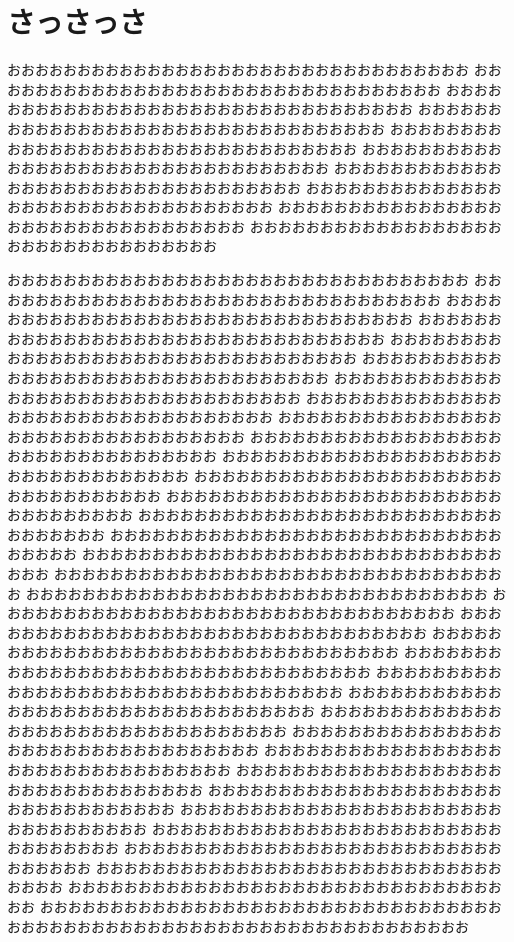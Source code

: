 \documentclass{jbook}
\begin{document}
\section{さっさっさ}
おおおおおおおおおおおおおおおおおおおおおおおおおおおおおおおおお
おおおおおおおおおおおおおおおおおおおおおおおおおおおおおおおおお
おおおおおおおおおおおおおおおおおおおおおおおおおおおおおおおおお
おおおおおおおおおおおおおおおおおおおおおおおおおおおおおおおおお
おおおおおおおおおおおおおおおおおおおおおおおおおおおおおおおおお
おおおおおおおおおおおおおおおおおおおおおおおおおおおおおおおおお
おおおおおおおおおおおおおおおおおおおおおおおおおおおおおおおおお
おおおおおおおおおおおおおおおおおおおおおおおおおおおおおおおおお
おおおおおおおおおおおおおおおおおおおおおおおおおおおおおおおおお
おおおおおおおおおおおおおおおおおおおおおおおおおおおおおおおおお

おおおおおおおおおおおおおおおおおおおおおおおおおおおおおおおおお
おおおおおおおおおおおおおおおおおおおおおおおおおおおおおおおおお
おおおおおおおおおおおおおおおおおおおおおおおおおおおおおおおおお
おおおおおおおおおおおおおおおおおおおおおおおおおおおおおおおおお
おおおおおおおおおおおおおおおおおおおおおおおおおおおおおおおおお
おおおおおおおおおおおおおおおおおおおおおおおおおおおおおおおおお
おおおおおおおおおおおおおおおおおおおおおおおおおおおおおおおおお
おおおおおおおおおおおおおおおおおおおおおおおおおおおおおおおおお
おおおおおおおおおおおおおおおおおおおおおおおおおおおおおおおおお
おおおおおおおおおおおおおおおおおおおおおおおおおおおおおおおおお
おおおおおおおおおおおおおおおおおおおおおおおおおおおおおおおおお
おおおおおおおおおおおおおおおおおおおおおおおおおおおおおおおおお
おおおおおおおおおおおおおおおおおおおおおおおおおおおおおおおおお
おおおおおおおおおおおおおおおおおおおおおおおおおおおおおおおおお
おおおおおおおおおおおおおおおおおおおおおおおおおおおおおおおおお
おおおおおおおおおおおおおおおおおおおおおおおおおおおおおおおおお
おおおおおおおおおおおおおおおおおおおおおおおおおおおおおおおおお
おおおおおおおおおおおおおおおおおおおおおおおおおおおおおおおおお
おおおおおおおおおおおおおおおおおおおおおおおおおおおおおおおおお
おおおおおおおおおおおおおおおおおおおおおおおおおおおおおおおおお
おおおおおおおおおおおおおおおおおおおおおおおおおおおおおおおおお
おおおおおおおおおおおおおおおおおおおおおおおおおおおおおおおおお
おおおおおおおおおおおおおおおおおおおおおおおおおおおおおおおおお
おおおおおおおおおおおおおおおおおおおおおおおおおおおおおおおおお
おおおおおおおおおおおおおおおおおおおおおおおおおおおおおおおおお
おおおおおおおおおおおおおおおおおおおおおおおおおおおおおおおおお
おおおおおおおおおおおおおおおおおおおおおおおおおおおおおおおおお
おおおおおおおおおおおおおおおおおおおおおおおおおおおおおおおおお
おおおおおおおおおおおおおおおおおおおおおおおおおおおおおおおおお
おおおおおおおおおおおおおおおおおおおおおおおおおおおおおおおおお
おおおおおおおおおおおおおおおおおおおおおおおおおおおおおおおおお
おおおおおおおおおおおおおおおおおおおおおおおおおおおおおおおおお
おおおおおおおおおおおおおおおおおおおおおおおおおおおおおおおおお
おおおおおおおおおおおおおおおおおおおおおおおおおおおおおおおおお
おおおおおおおおおおおおおおおおおおおおおおおおおおおおおおおおお
おおおおおおおおおおおおおおおおおおおおおおおおおおおおおおおおお
\end{document}

